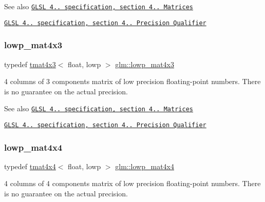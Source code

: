 \begin{DoxySeeAlso}{See also}
\href{http://www.opengl.org/registry/doc/GLSLangSpec.4.20.8.pdf}{\tt G\+L\+SL 4.. specification, section 4.. Matrices} 

\href{http://www.opengl.org/registry/doc/GLSLangSpec.4.20.8.pdf}{\tt G\+L\+SL 4.. specification, section 4.. Precision Qualifier} 
\end{DoxySeeAlso}
\mbox{\label{group__core__precision_ga4649624907ac00347237476ead4178e1}} 
\subsubsection{\texorpdfstring{lowp\+\_\+mat4x3}{lowp\_mat4x3}}
{\footnotesize\ttfamily typedef \hyperlink{structglm_1_1tmat4x3}{tmat4x3}$<$ float, lowp $>$ \hyperlink{group__core__precision_ga4649624907ac00347237476ead4178e1}{glm\+::lowp\+\_\+mat4x3}}

4 columns of 3 components matrix of low precision floating-\/point numbers. There is no guarantee on the actual precision.

\begin{DoxySeeAlso}{See also}
\href{http://www.opengl.org/registry/doc/GLSLangSpec.4.20.8.pdf}{\tt G\+L\+SL 4.. specification, section 4.. Matrices} 

\href{http://www.opengl.org/registry/doc/GLSLangSpec.4.20.8.pdf}{\tt G\+L\+SL 4.. specification, section 4.. Precision Qualifier} 
\end{DoxySeeAlso}
\mbox{\label{group__core__precision_ga83e14edb4422871bdc644f4209b5f9ff}} 
\subsubsection{\texorpdfstring{lowp\+\_\+mat4x4}{lowp\_mat4x4}}
{\footnotesize\ttfamily typedef \hyperlink{structglm_1_1tmat4x4}{tmat4x4}$<$ float, lowp $>$ \hyperlink{group__core__precision_ga83e14edb4422871bdc644f4209b5f9ff}{glm\+::lowp\+\_\+mat4x4}}

4 columns of 4 components matrix of low precision floating-\/point numbers. There is no guarantee on the actual precision.

